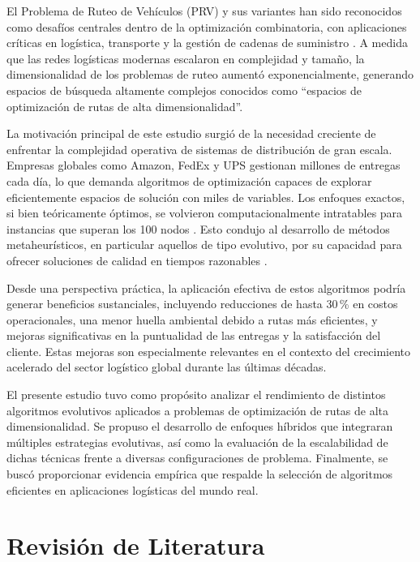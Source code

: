 \documentclass[conference]{IEEEtran}
\begin{document}
El Problema de Ruteo de Vehículos (PRV) y sus variantes han sido reconocidos como desafíos centrales dentro de la optimización combinatoria, con aplicaciones críticas en logística, transporte y la gestión de cadenas de suministro \cite{toth2014}. A medida que las redes logísticas modernas escalaron en complejidad y tamaño, la dimensionalidad de los problemas de ruteo aumentó exponencialmente, generando espacios de búsqueda altamente complejos conocidos como ``espacios de optimización de rutas de alta dimensionalidad''.

La motivación principal de este estudio surgió de la necesidad creciente de enfrentar la complejidad operativa de sistemas de distribución de gran escala. Empresas globales como Amazon, FedEx y UPS gestionan millones de entregas cada día, lo que demanda algoritmos de optimización capaces de explorar eficientemente espacios de solución con miles de variables. Los enfoques exactos, si bien teóricamente óptimos, se volvieron computacionalmente intratables para instancias que superan los 100 nodos \cite{applegate2007}. Esto condujo al desarrollo de métodos metaheurísticos, en particular aquellos de tipo evolutivo, por su capacidad para ofrecer soluciones de calidad en tiempos razonables \cite{blum2003}.

Desde una perspectiva práctica, la aplicación efectiva de estos algoritmos podría generar beneficios sustanciales, incluyendo reducciones de hasta 30\,\% en costos operacionales\cite{toth2014}, una menor huella ambiental debido a rutas más eficientes, y mejoras significativas en la puntualidad de las entregas y la satisfacción del cliente. Estas mejoras son especialmente relevantes en el contexto del crecimiento acelerado del sector logístico global durante las últimas décadas.

El presente estudio tuvo como propósito analizar el rendimiento de distintos algoritmos evolutivos aplicados a problemas de optimización de rutas de alta dimensionalidad. Se propuso el desarrollo de enfoques híbridos que integraran múltiples estrategias evolutivas, así como la evaluación de la escalabilidad de dichas técnicas frente a diversas configuraciones de problema. Finalmente, se buscó proporcionar evidencia empírica que respalde la selección de algoritmos eficientes en aplicaciones logísticas del mundo real.

\section{Revisión de Literatura}
\end{document}
